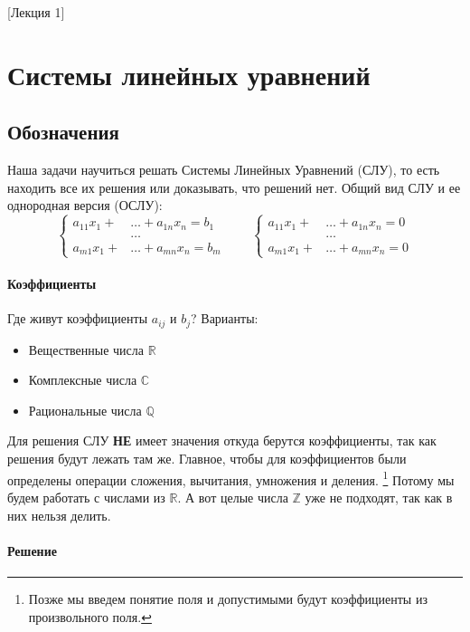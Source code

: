 [Лекция 1]

\newpage

\section{Системы линейных уравнений}

\subsection{Обозначения}

Наша задачи научиться решать Системы Линейных Уравнений (СЛУ), то есть находить все их решения или доказывать, что решений нет.
Общий вид СЛУ и ее однородная версия (ОСЛУ):
\[
\left\{
\begin{aligned}
a_{11}x_1 + &\ldots + a_{1n}x_n = b_1\\
&\ldots \\
a_{m1}x_1 + &\ldots + a_{mn}x_n = b_m
\end{aligned}
\right.\quad\quad
\left\{
\begin{aligned}
a_{11}x_1 + &\ldots + a_{1n}x_n = 0\\
&\ldots \\
a_{m1}x_1 + &\ldots + a_{mn}x_n = 0
\end{aligned}
\right.
\]

\paragraph{Коэффициенты}

Где живут коэффициенты $a_{ij}$ и $b_j$?
Варианты:
\begin{itemize}
\item Вещественные числа $\mathbb R$

\item Комплексные числа $\mathbb C$

\item Рациональные числа $\mathbb Q$
\end{itemize}
Для решения СЛУ {\bf НЕ} имеет значения откуда берутся коэффициенты, так как решения будут лежать там же.
Главное, чтобы для коэффициентов были определены операции сложения, вычитания, умножения и деления.%
\footnote{Позже мы введем понятие поля и допустимыми будут коэффициенты из произвольного поля.}
Потому мы будем работать с числами из $\mathbb R$.
А вот целые числа $\mathbb Z$ уже не подходят, так как в них нельзя делить.

\paragraph{Решение}

